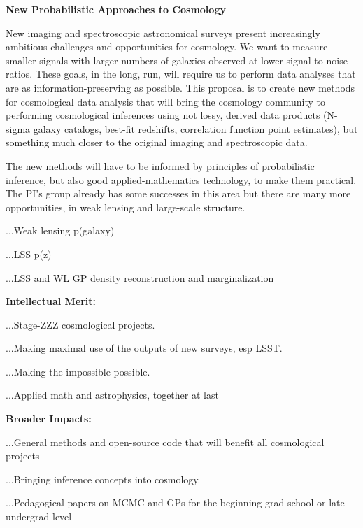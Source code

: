 \documentclass[12pt]{article}
\begin{document}
\sloppy\sloppypar\thispagestyle{empty}

\noindent
\textbf{New Probabilistic Approaches to Cosmology}
\smallskip

New imaging and spectroscopic astronomical surveys present
increasingly ambitious challenges and opportunities for cosmology.
We want to measure smaller signals with larger numbers of galaxies
observed at lower signal-to-noise ratios.
These goals, in the long, run, will require us to perform data
analyses that are as information-preserving as possible.
This proposal is to create new methods for cosmological data analysis
that will bring the cosmology community to performing cosmological
inferences using not lossy, derived data products (N-sigma galaxy
catalogs, best-fit redshifts, correlation function point estimates),
but something much closer to the original imaging and spectroscopic
data.

The new methods will have to be informed by principles of
probabilistic inference, but also good applied-mathematics technology,
to make them practical.
The PI's group already has some successes in this area but there are
many more opportunities, in weak lensing and large-scale structure.

...Weak lensing p(galaxy)

...LSS p(z)

...LSS and WL GP density reconstruction and marginalization

\noindent
\textbf{Intellectual Merit:}

...Stage-ZZZ cosmological projects.

...Making maximal use of the outputs of new surveys, esp LSST.

...Making the impossible possible.

...Applied math and astrophysics, together at last

\noindent
\textbf{Broader Impacts:}

...General methods and open-source code that will benefit all cosmological projects

...Bringing inference concepts into cosmology.

...Pedagogical papers on MCMC and GPs for the beginning grad school or late undergrad level
\end{document}
